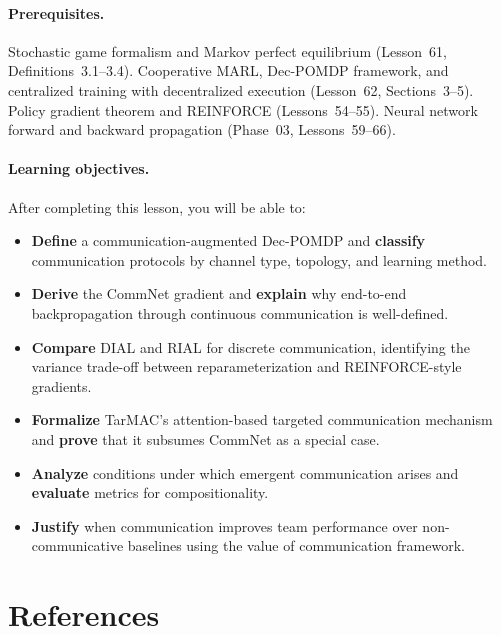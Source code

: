 \documentclass[11pt,a4paper]{article}
\begin{document}
\paragraph{Prerequisites.}
Stochastic game formalism and Markov perfect equilibrium
(Lesson~61, Definitions~3.1--3.4).  Cooperative MARL, Dec-POMDP
framework, and centralized training with decentralized execution
(Lesson~62, Sections~3--5).  Policy gradient theorem and
REINFORCE (Lessons~54--55).  Neural network forward and backward
propagation (Phase~03, Lessons~59--66).

\paragraph{Learning objectives.}
After completing this lesson, you will be able to:
\begin{itemize}[nosep]
  \item \textbf{Define} a communication-augmented Dec-POMDP and
    \textbf{classify} communication protocols by channel type,
    topology, and learning method.
  \item \textbf{Derive} the CommNet gradient and \textbf{explain}
    why end-to-end backpropagation through continuous communication
    is well-defined.
  \item \textbf{Compare} DIAL and RIAL for discrete communication,
    identifying the variance trade-off between reparameterization
    and REINFORCE-style gradients.
  \item \textbf{Formalize} TarMAC's attention-based targeted
    communication mechanism and \textbf{prove} that it subsumes
    CommNet as a special case.
  \item \textbf{Analyze} conditions under which emergent
    communication arises and \textbf{evaluate} metrics for
    compositionality.
  \item \textbf{Justify} when communication improves team
    performance over non-communicative baselines using the value of
    communication framework.
\end{itemize}

\section{References}
\label{sec:references}
\end{document}
